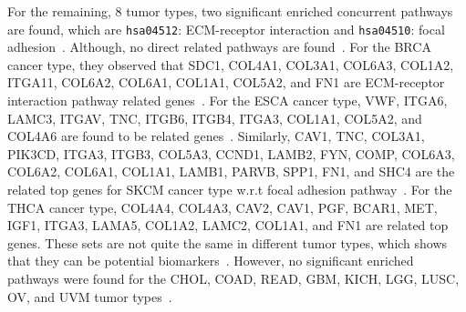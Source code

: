 \hspace*{3.5mm} For the remaining, 8 tumor types, two significant enriched concurrent pathways are found, which are \texttt{hsa04512}: ECM-receptor interaction and \texttt{hsa04510}: focal adhesion~\cite{lyu2018deep}. Although, no direct related pathways are found~\cite{lyu2018deep}. 
For the BRCA cancer type, they observed that SDC1, COL4A1, COL3A1, COL6A3, COL1A2, ITGA11, COL6A2, COL6A1, COL1A1, COL5A2, and FN1 are ECM-receptor interaction pathway related genes~\cite{lyu2018deep}. For the ESCA cancer type, VWF, ITGA6, LAMC3, ITGAV, TNC, ITGB6, ITGB4, ITGA3, COL1A1, COL5A2, and COL4A6 are found to be related genes~\cite{lyu2018deep}. Similarly,  CAV1, TNC, COL3A1, PIK3CD, ITGA3, ITGB3, COL5A3, CCND1, LAMB2, FYN, COMP, COL6A3, COL6A2, COL6A1, COL1A1, LAMB1, PARVB, SPP1, FN1, and SHC4 are the related top genes for SKCM cancer type w.r.t focal adhesion pathway~\cite{lyu2018deep}. For the THCA cancer type, COL4A4, COL4A3, CAV2, CAV1, PGF, BCAR1, MET, IGF1, ITGA3, LAMA5, COL1A2, LAMC2, COL1A1, and FN1 are related top genes. These sets are not quite the same in different tumor types, which shows that they can be potential biomarkers~\cite{lyu2018deep}. However, no significant enriched pathways were found for the CHOL, COAD, READ, GBM, KICH, LGG, LUSC, OV, and UVM tumor types~\cite{lyu2018deep}. 



